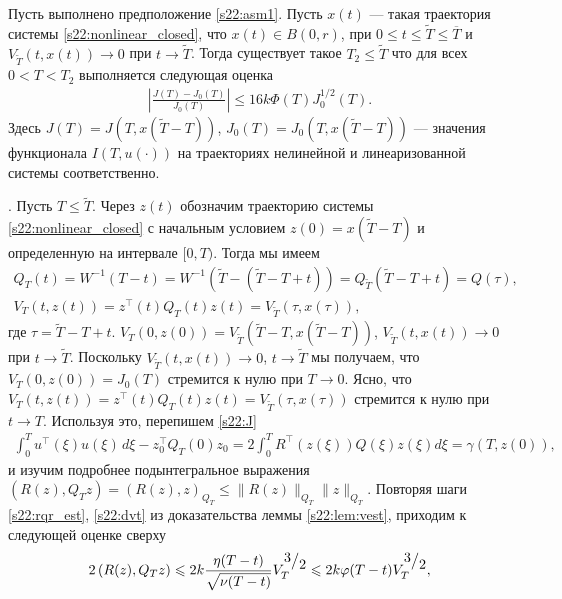 \documentclass[../main.tex]{subfiles}
\begin{document}
\begin{theorem}\label{s22:th:functional_error_estimate}
  Пусть выполнено предположение \ref{s22:asm1}. 
Пусть $x(t)$ --- такая траектория системы  \eqref{s22:nonlinear_closed}, что $x(t)\in B(0,r)$, при $0\leqslant t  \leqslant \tilde{T} \leqslant \overline{T} $ и $V_{\tilde{T}}(t,x(t))\to 0$ при $t\to \tilde{T}$.  
  Тогда существует такое $T_2 \leqslant \tilde{T}$ что для всех  $0 < T < T_2 $ выполняется следующая оценка
   \begin{gather} \label{s22:est}
     \left| \frac{    J(T) - J_0(T)}{J_0(T)}\right| \leqslant 16k\Phi({T})J^{1/2}_0(T).
    \end{gather}
    Здесь $J(T)=J(T,x(\tilde{T}-T))$, $J_0(T)=J_0(T,x(\tilde{T}-T))$ --- значения функционала $I(T,u(\cdot))$ на траекториях нелинейной и линеаризованной системы соответственно.
\end{theorem}
\doc. 
Пусть $T\leqslant \tilde{T}$. 
Через $z(t)$ обозначим траекторию системы  \eqref{s22:nonlinear_closed} с начальным условием $z(0)=x(\tilde{T}-T)$ и определенную на интервале $[0,T)$. 
Тогда мы имеем 
\begin{gather*}
Q_T(t)=W^{-1}(T-t)=W^{-1}(\tilde{T}-(\tilde{T}-T+t))=Q_{\tilde{T}}(\tilde{T}-T+t) = Q(\tau), \\ V_T(t,z(t))=z^\top(t)Q_T(t)z(t)=V_{\tilde{T}}(\tau,x(\tau)),
\end{gather*}
где $\tau=\tilde{T}-T+t$. 
$V_T(0,z(0))=V_{\tilde{T}}(\tilde{T}-T, x(\tilde{T}-T))$, $V_{\tilde{T}}(t,x(t))\to 0$ при $t\to \tilde{T}$. 
Поскольку  $V_{\tilde{T}}(t,x(t))\to 0$,  $t\to \tilde{T}$ мы получаем, что $V_T(0,z(0))=J_0(T)$  стремится к нулю при $T\to 0$.
Ясно, что  $V_T(t,z(t))=z^\top(t)Q_T(t)z(t)=V_{\tilde{T}}(\tau,x(\tau))$ стремится к нулю при $t\to T$.
Используя это, перепишем \eqref{s22:J} 
\begin{gather}\label{s22:J1}
     \int_{0}^{T} u^{\top}(\xi)  u(\xi) \, d\xi - z_0^{\top} Q_T(0)z_0= 2\int_{0}^{T}  R^{\top}(z(\xi))Q(\xi) z(\xi) d\xi=\gamma(T,z(0)),
\end{gather}
и изучим подробнее подынтегральное выражения $\left( R(z), Q_T z\right)=(R(z),z)_{Q_T} \leqslant \| R(z) \|_{Q_T} \| z \|_{Q_T}$.
Повторяя шаги  \eqref{s22:rqr_est}, \eqref{s22:dvt} из доказательства леммы  \ref{s22:lem:vest}, приходим к следующей оценке сверху
\begin{gather}\label{s22:rqz}
    2 \left( R(z), Q_T z\right) \leqslant 2 k \frac{\eta(T-t)}{\sqrt{\nu(T-t)}}V_T^{\frc{3}{2}} \leqslant 2k \varphi(T-t) V_T^{\frc{3}{2}},
\end{gather}
\end{document}
